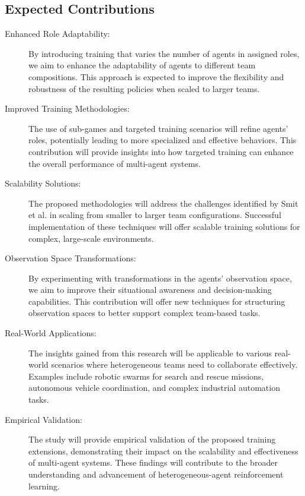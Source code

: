 \subsection{Expected Contributions}
\begin{description}
    \item[Enhanced Role Adaptability:] 
    By introducing training that varies the number of agents in assigned roles, 
    we aim to enhance the adaptability of agents to different team compositions. 
    This approach is expected to improve the flexibility and robustness of the resulting 
    policies when scaled to larger teams.
    \item[Improved Training Methodologies:] 
    The use of sub-games and targeted training scenarios will refine agents' roles, 
    potentially leading to more specialized and effective behaviors. 
    This contribution will provide insights into how targeted training can enhance the 
    overall performance of multi-agent systems.
    \item[Scalability Solutions:] 
    The proposed methodologies will address the challenges identified by Smit et al. 
    in scaling from smaller to larger team configurations. Successful implementation of these 
    techniques will offer scalable training solutions for complex, large-scale environments.
    \item[Observation Space Transformations:] 
    By experimenting with transformations in the agents' observation space, 
    we aim to improve their situational awareness and decision-making capabilities. 
    This contribution will offer new techniques for structuring observation spaces to 
    better support complex team-based tasks.
    \item[Real-World Applications:] 
    The insights gained from this research will be applicable to various real-world scenarios 
    where heterogeneous teams need to collaborate effectively. 
    Examples include robotic swarms for search and rescue missions, 
    autonomous vehicle coordination, and complex industrial automation tasks.
    \item[Empirical Validation:] 
    The study will provide empirical validation of the proposed training extensions, 
    demonstrating their impact on the scalability and effectiveness of multi-agent systems. 
    These findings will contribute to the broader understanding and advancement of 
    heterogeneous-agent reinforcement learning.
\end{description}


